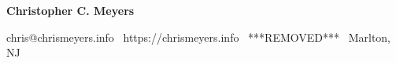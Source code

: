 
\begin{center}
{\LARGE \textbf{Christopher C. Meyers}}
\end{center}
\begin{center}
chris@chrismeyers.info \textbullet \  https://chrismeyers.info \textbullet \ ***REMOVED*** \textbullet \ Marlton, NJ
\end{center}
